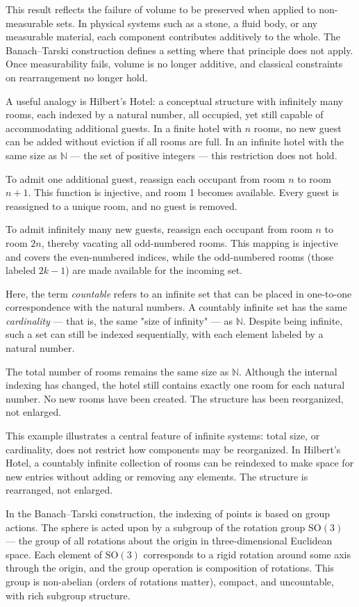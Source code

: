 This result reflects the failure of volume to be preserved when applied to non-measurable sets. In physical systems such as a stone, a fluid body, or any measurable material, each component contributes additively to the whole. The Banach–Tarski construction defines a setting where that principle does not apply. Once measurability fails, volume is no longer additive, and classical constraints on rearrangement no longer hold.

A useful analogy is Hilbert’s Hotel: a conceptual structure with infinitely many rooms, each indexed by a natural number, all occupied, yet still capable of accommodating additional guests. In a finite hotel with $n$ rooms, no new guest can be added without eviction if all rooms are full. In an infinite hotel with the same size as $\mathbb{N}$ — the set of positive integers — this restriction does not hold.

To admit one additional guest, reassign each occupant from room $n$ to room $n+1$. This function is injective, and room 1 becomes available. Every guest is reassigned to a unique room, and no guest is removed.

To admit infinitely many new guests, reassign each occupant from room $n$ to room $2n$, thereby vacating all odd-numbered rooms. This mapping is injective and covers the even-numbered indices, while the odd-numbered rooms (those labeled $2k-1$) are made available for the incoming set.

Here, the term \emph{countable} refers to an infinite set that can be placed in one-to-one correspondence with the natural numbers. A countably infinite set has the same \emph{cardinality} — that is, the same "size of infinity" — as $\mathbb{N}$. Despite being infinite, such a set can still be indexed sequentially, with each element labeled by a natural number.

The total number of rooms remains the same size as $\mathbb{N}$. Although the internal indexing has changed, the hotel still contains exactly one room for each natural number. No new rooms have been created. The structure has been reorganized, not enlarged.

This example illustrates a central feature of infinite systems: total size, or cardinality, does not restrict how components may be reorganized. In Hilbert’s Hotel, a countably infinite collection of rooms can be reindexed to make space for new entries without adding or removing any elements. The structure is rearranged, not enlarged.

In the Banach–Tarski construction, the indexing of points is based on group actions. The sphere is acted upon by a subgroup of the rotation group $\mathrm{SO}(3)$ — the group of all rotations about the origin in three-dimensional Euclidean space. Each element of $\mathrm{SO}(3)$ corresponds to a rigid rotation around some axis through the origin, and the group operation is composition of rotations. This group is non-abelian (orders of rotations matter), compact, and uncountable, with rich subgroup structure.

